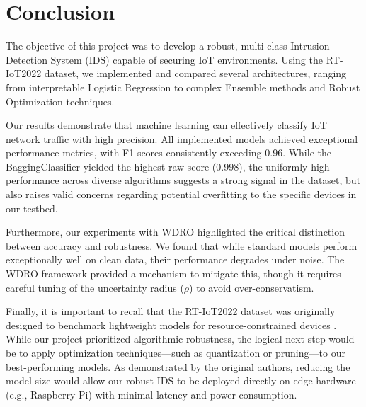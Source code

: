 \documentclass[12pt, a4paper]{article}
\begin{document}
\section{Conclusion}

The objective of this project was to develop a robust, multi-class Intrusion Detection System (IDS) capable of securing IoT environments. Using the RT-IoT2022 dataset, we implemented and compared several architectures, ranging from interpretable Logistic Regression to complex Ensemble methods and Robust Optimization techniques.

Our results demonstrate that machine learning can effectively classify IoT network traffic with high precision. All implemented models achieved exceptional performance metrics, with F1-scores consistently exceeding 0.96. While the BaggingClassifier yielded the highest raw score (0.998), the uniformly high performance across diverse algorithms suggests a strong signal in the dataset, but also raises valid concerns regarding potential overfitting to the specific devices in our testbed.

Furthermore, our experiments with WDRO highlighted the critical distinction between accuracy and robustness. We found that while standard models perform exceptionally well on clean data, their performance degrades under noise. The WDRO framework provided a mechanism to mitigate this, though it requires careful tuning of the uncertainty radius ($\rho$) to avoid over-conservatism.

Finally, it is important to recall that the RT-IoT2022 dataset was originally designed to benchmark lightweight models for resource-constrained devices \cite{sharmila2023quantized}. While our project prioritized algorithmic robustness, the logical next step would be to apply optimization techniques—such as quantization or pruning—to our best-performing models. As demonstrated by the original authors, reducing the model size would allow our robust IDS to be deployed directly on edge hardware (e.g., Raspberry Pi) with minimal latency and power consumption.


\newpage
\printbibliography[title={Scientific References}]
\end{document}

